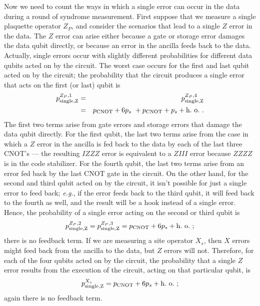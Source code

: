 Now we need to count the ways in which a single error can occur in the data during a round of syndrome measurement. First suppose that we measure a single pla\-quette operator $Z_P$, and consider the scenarios that lead to a single $Z$ error in the data. The $Z$ error can arise either because a gate or storage error damages the data qubit directly, or because an error in the ancilla feeds back to the data. Actually, single errors occur with slightly different probabilities for different data qubits acted on by the circuit.  The worst case occurs for the first and last qubit acted on by the circuit; the probability that the circuit produces a single error that acts on the first (or last) qubit is 
\begin{eqnarray}
p_{\rm single,Z}^{Z_P,1}&=&p_{\rm single,Z}^{Z_P,4}\nonumber\\
&=&p_{\rm CNOT} + 6p_s~  + p_{\rm
CNOT} + p_s + {\rm h.~o.}~.
\end{eqnarray}
The first two terms arise from gate errors and storage errors that damage the data qubit directly. For the first qubit, the last two terms arise from the case in which a $Z$ error in the ancilla is fed back to the data by each of the last three CNOT's --- the resulting $IZZZ$ error is equivalent to a $ZIII$ error because $ZZZZ$ is in the code stabilizer. For the fourth qubit, the last two terms arise from an error fed back by the last CNOT gate in the circuit. On the other hand, for the second and third qubit acted on by the circuit, it isn't possible for just a single error to feed back; {\it e.g.}, if the error feeds back to the third qubit, it will feed back to the fourth as well, and the result will be a hook instead of a single error. Hence, the probability of a single error acting on the second or third qubit is\begin{equation}
p_{\rm single,Z}^{Z_P,2}=p_{\rm single,Z}^{Z_P,3}=p_{\rm CNOT} + 6p_s+{\rm h.~o.}
~;
\end{equation}
there is no feedback term.
If we are measuring a site operator $X_s$, then $X$ errors might feed back from the ancilla to the data, but $Z$ errors will not. Therefore, for each of the four qubits acted on by the circuit, the probability that a single $Z$ error results from the execution of the circuit, acting on that particular qubit, is
\begin{equation}
p_{\rm single,Z}^{X_s}=p_{\rm CNOT} + 6p_s+{\rm h.~o.}
~;
\end{equation}
again there is no feedback term.

